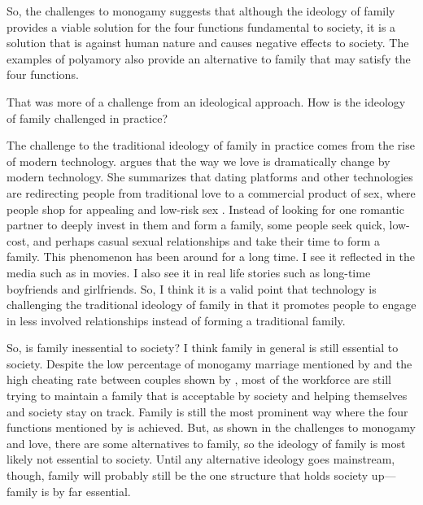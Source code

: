\documentclass[12pt]{article}
\begin{document}
So, the challenges to monogamy suggests that although the ideology of family
provides a viable solution for the four functions fundamental to society,
it is a solution that is against human nature and
causes negative effects to society.
The examples of polyamory also provide an alternative to family that may
satisfy the four functions.

That was more of a challenge from an ideological approach.
How is the ideology of family challenged in practice?

The challenge to the traditional ideology of family in practice comes from
the rise of modern technology.
\citet{malinowska2022love} argues that the way we love is
dramatically change by modern technology.
She summarizes that dating platforms and other technologies are redirecting
people from traditional love to a commercial product of sex,
where people shop for appealing and low-risk sex \citep{malinowska2022love}.
Instead of looking for one romantic partner to deeply invest in them and form a
family, some people seek quick, low-cost,
and perhaps casual sexual relationships and take their time to form a family.
This phenomenon has been around for a long time.
I see it reflected in the media such as in movies.
I also see it in real life stories such as long-time boyfriends and girlfriends.
So, I think it is a valid point that technology is challenging the traditional
ideology of family in that it promotes people to engage in less involved
relationships instead of forming a traditional family.

So, is family inessential to society?
I think family in general is still essential to society.
Despite the low percentage of monogamy marriage mentioned by
\citet[p. 63]{gittins1993family} and the high cheating rate between couples
shown by \citet{fridman2023aella},
most of the workforce are still trying to maintain a family that is acceptable
by society and helping themselves and society stay on track.
Family is still the most prominent way where the four functions mentioned by
\citet[p. 60]{gittins1993family} is achieved.
But, as shown in the challenges to monogamy and love,
there are some alternatives to family,
so the ideology of family is most likely not essential to society.
Until any alternative ideology goes mainstream, though,
family will probably still be the one structure that holds society up—family
is by far essential.
\pagebreak


\end{document}
